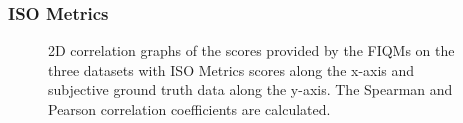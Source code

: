 \subsubsection{ISO Metrics}
\begin{figure}[h]
\centering
    \caption{2D correlation graphs of the scores provided by the FIQMs on the three datasets with ISO Metrics scores along the x-axis and subjective ground truth data along the y-axis. The Spearman and Pearson correlation coefficients are calculated.}
    \label{fig:corrISOsvsSub}
\end{figure}
